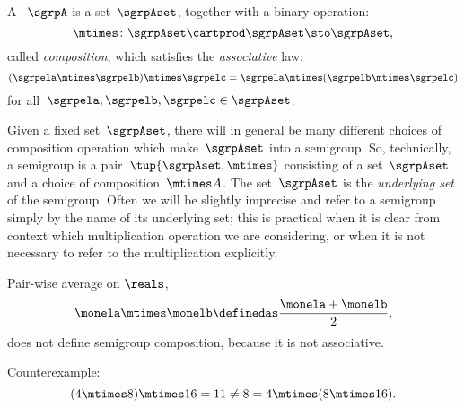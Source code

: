 


\section{}\label{sec:semigroups}

\begin{ctdefinition}[Semigroup]
  \label{def:semigroup}
  A \emph{}~$\sgrpA$ is a set~$\sgrpAset$, together with a binary operation:
  \begin{equation}
    \mtimes  \colon \sgrpAset \cartprod \sgrpAset \sto \sgrpAset,
  \end{equation}
  called \emph{composition}, which satisfies the \emph{associative} law:
  \begin{equation}
    \label{eq:semigroup-associative}
    (\sgrpela \mtimes   \sgrpelb)\mtimes   \sgrpelc
    = \sgrpela \mtimes   (\sgrpelb \mtimes  \sgrpelc)
  \end{equation}
  for all~$\sgrpela , \sgrpelb, \sgrpelc \in \sgrpAset$.
\end{ctdefinition}


\begin{remark}
  Given a fixed set~$\sgrpAset$, there will in general be many different choices of composition operation which make~$\sgrpAset$ into a semigroup.
  So, technically, a semigroup is a pair~$\tup{\sgrpAset, \mtimes}$ consisting of a set~$\sgrpAset$ and a choice of composition~$\mtimes A$.
  The set~$\sgrpAset$ is the \emph{underlying set} of the semigroup.
  Often we will be slightly imprecise and refer to a semigroup simply by the name of its underlying set;
  this is practical when it is clear from context which multiplication operation we are considering, or when it is not necessary to refer to the multiplication explicitly.
\end{remark}



\begin{example}
Pair-wise average on $\reals$,
\begin{equation}
    \label{eq:pairwise}
    \monela \mtimes \monelb \definedas  \frac{\monela + \monelb}{2},
\end{equation}
does not define semigroup composition, because it is not associative.

Counterexample:
\begin{equation}\label{eq:pairwise-counterexample}
(4 \mtimes 8) \mtimes 16 = 11 \neq  8 = 4 \mtimes (8 \mtimes 16).
\end{equation}
\end{example}



